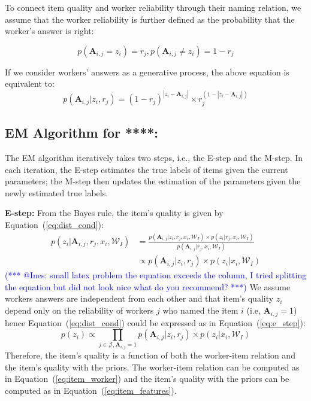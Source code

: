 \documentclass{article}
\makeatletter
\newcommand{\sys}{****\xspace}
\newcommand{\iar}[1]{\textcolor{blue}{(*** @Ines: #1 ***)}}
\makeatother
\begin{document}
To connect item quality and worker reliability through their naming relation, we assume that the worker reliability is further defined as the probability that the worker's answer is right:

\begin{equation}
    p(\mathbf{A}_{i,j} = z_i) =  r_j, p(\mathbf{A}_{i,j} \ne z_i) = 1- r_j
    \label{eq:item_worker_rel}
\end{equation}

If we consider workers' answers as a generative process, the above equation is equivalent to:
\begin{equation}
    p(\mathbf{A}_{i,j} | z_i,  r_j) = (1- r_j)^{|z_i-\mathbf{A}_{i,j}|}\times  r_j^{(1-|z_i-\mathbf{A}_{i,j}|)}
    \label{eq:item_worker}
\end{equation}

\subsection{EM Algorithm for \sys:} 
The EM algorithm iteratively takes two steps, i.e., the E-step and the
M-step. In each iteration, the E-step estimates the true labels of items given
the current parameters; the M-step then updates the estimation of
the parameters given the newly estimated true labels.

\noindent\textbf{E-step:}
From the Bayes rule, the item's quality is given by Equation~(\ref{eq:dist_cond}):
\begin{align}
    p(z_i|\mathbf{A}_{i,j},r_{j},x_i,\mathcal{W}_I)&=\frac{p(\mathbf{A}_{i,j}|z_i,r_j,x_i,\mathcal{W}_I)\times p(z_i|r_j,x_i,\mathcal{W}_I)}{p(\mathbf{A}_{i,j}|r_j,x_i,\mathcal{W}_I)}\nonumber\\
        &\propto p(\mathbf{A}_{i,j}|z_i,r_j)\times p(z_i|x_i,\mathcal{W}_I)
    \label{eq:dist_cond}
\end{align}
\iar{small latex problem the equation exceeds the column, I tried splitting the equation but did not look nice
what do you recommend?}
We assume workers answers are independent from each other and 
that item's quality $z_i$ depend only on the reliability of workers $j$ who named the
item $i$ (i.e, $\mathbf{A}_{i,j}=1$) hence Equation~(\ref{eq:dist_cond})
could be expressed as in Equation~(\ref{eq:e_step}):
\begin{equation}
    p(z_i) \propto \prod_{j \in \mathcal{J},\mathbf{A}_{i,j}=1} p(\mathbf{A}_{i,j}|z_i,r_{j})\times p(z_i|x_i,\mathcal{W}_I)
    \label{eq:e_step}
\end{equation}
Therefore, the item's quality is a function of both the worker-item relation and the item's quality with the priors.
The worker-item relation can be computed as in Equation~(\ref{eq:item_worker}) and the item's quality with 
the priors can be computed as in Equation~(\ref{eq:item_features}).
\end{document}
